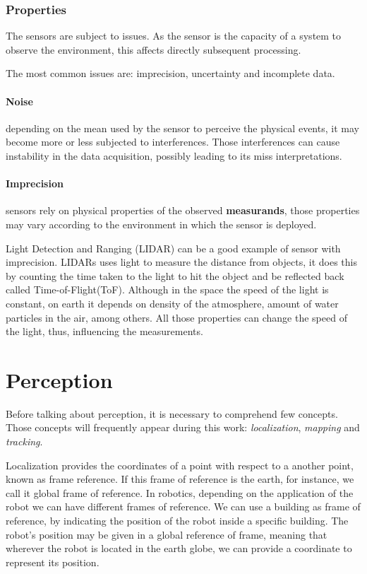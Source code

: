 \subsubsection{Properties}

The sensors are subject to issues. As the sensor is the capacity of a system to observe the environment, this affects directly subsequent processing.

The most common issues are: imprecision, uncertainty and incomplete data. 

\paragraph{Noise} depending on the mean used by the sensor to perceive the physical events, it may become more or less subjected to interferences. Those interferences can cause instability in the data acquisition, possibly leading to its miss interpretations.

\paragraph{Imprecision} sensors rely on physical properties of the observed \textbf{measurands}, those properties may vary according to the environment in which the sensor is deployed.

Light Detection and Ranging (LIDAR) can be a good example of sensor with imprecision. LIDARs uses light to measure the distance from objects, it does this by counting the time taken to the light to hit the object and be reflected back called Time-of-Flight(ToF). Although in the space the speed of the light is constant, on earth it depends on density of the atmosphere, amount of water particles in the air, among others. All those properties can change the speed of the light, thus, influencing the measurements.

\section{Perception}

Before talking about perception, it is necessary to comprehend few concepts. Those concepts will frequently appear during this work: \textit{localization}, \textit{mapping} and \textit{tracking}.

Localization provides the coordinates of a point with respect to a another point, known as frame reference. If this frame of reference is the earth, for instance, we call it global frame of reference. In robotics, depending on the application of the robot we can have different frames of reference. We can use a building as frame of reference, by indicating the position of the robot inside a specific building. The robot's position may be given in a global reference of frame, meaning that wherever the robot is located in the earth globe, we can provide a coordinate to represent its position. 


